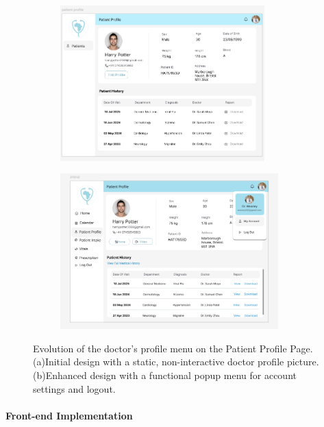 \begin{figure}[H]
  \centering
  \captionsetup[subfigure]{labelformat=simple, labelsep=space, justification=centering}
  \renewcommand{\thesubfigure}{(\alph{subfigure})}
  \begin{subfigure}[t]{0.48\linewidth}
    \centering
    \includegraphics[height=6cm]{images03/3-2-2-figure6a.png}
    \caption{}
    \label{fig:profile-menu-before}
  \end{subfigure}\hfill
  \begin{subfigure}[t]{0.48\linewidth}
    \centering
    \includegraphics[height=6cm]{images03/3-2-2-figure6b.png}
    \caption{}
    \label{fig:profile-menu-after}
  \end{subfigure}
  \caption{Evolution of the doctor's profile menu on the Patient Profile Page. (a)Initial design with a static, non-interactive doctor profile picture. (b)Enhanced design with a functional popup menu for account settings and logout.}
  \label{fig:profile-menu-evolution}
\end{figure}



\paragraph{Front-end Implementation}\mbox{}\\

